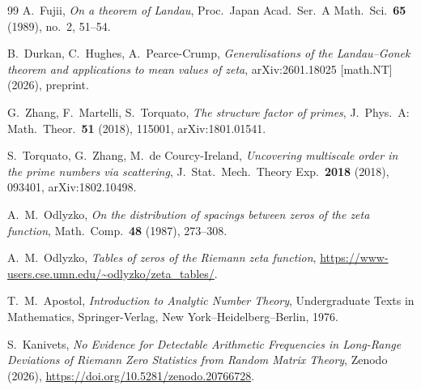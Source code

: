 \documentclass[12pt]{amsart}
\begin{document}
\begin{thebibliography}{99}
 A.~Fujii, \emph{On a theorem of Landau}, Proc.\ Japan Acad.\ Ser.\
A Math.\ Sci.\ \textbf{65} (1989), no.~2, 51--54.

 B.~Durkan, C.~Hughes, A.~Pearce-Crump, \emph{Generalisations of the
Landau--Gonek theorem and applications to mean values of zeta}, arXiv:2601.18025
[math.NT] (2026), preprint.

 G.~Zhang, F.~Martelli, S.~Torquato, \emph{The structure factor of
primes}, J.\ Phys.\ A: Math.\ Theor.\ \textbf{51} (2018), 115001, arXiv:1801.01541.

 S.~Torquato, G.~Zhang, M.~de Courcy-Ireland, \emph{Uncovering
multiscale order in the prime numbers via scattering}, J.\ Stat.\ Mech.\ Theory Exp.\
\textbf{2018} (2018), 093401, arXiv:1802.10498.

 A.~M.~Odlyzko, \emph{On the distribution of spacings between zeros
of the zeta function}, Math.\ Comp.\ \textbf{48} (1987), 273--308.

\bibitem{OdlyzkoTables} A.~M.~Odlyzko, \emph{Tables of zeros of the Riemann zeta
function}, \url{https://www-users.cse.umn.edu/~odlyzko/zeta_tables/}.

\bibitem{Apo76} T.~M.~Apostol, \emph{Introduction to Analytic Number Theory},
Undergraduate Texts in Mathematics, Springer-Verlag, New York--Heidelberg--Berlin,
1976.

 S.~Kanivets, \emph{No Evidence for Detectable Arithmetic
Frequencies in Long-Range Deviations of Riemann Zero Statistics from Random Matrix
Theory}, Zenodo (2026), \url{https://doi.org/10.5281/zenodo.20766728}.

\end{thebibliography}
\end{document}
